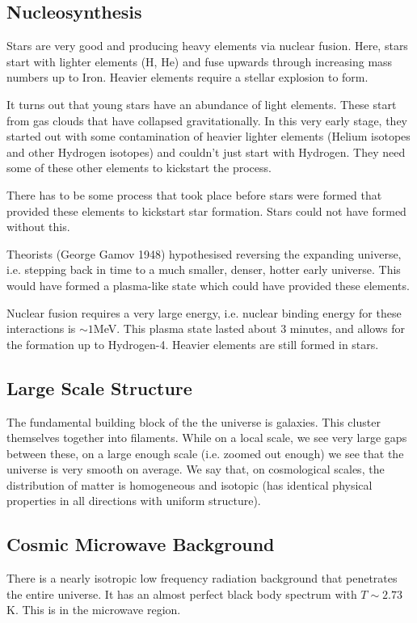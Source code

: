 \subsection{Nucleosynthesis}
Stars are very good and producing heavy elements via nuclear fusion. Here, stars start with lighter elements (H, He) and fuse upwards through increasing mass numbers up to Iron. Heavier elements require a stellar explosion to form.

It turns out that young stars have an abundance of light elements. These start from gas clouds that have collapsed gravitationally. In this very early stage, they started out with some contamination of heavier lighter elements (Helium isotopes and other Hydrogen isotopes) and couldn't just start with Hydrogen. They need some of these other elements to kickstart the process.

There has to be some process that took place before stars were formed that provided these elements to kickstart star formation. Stars could not have formed without this.

Theorists (George Gamov 1948) hypothesised reversing the expanding universe, i.e. stepping back in time to a much smaller, denser, hotter early universe. This would have formed a plasma-like state which could have provided these elements.

Nuclear fusion requires a very large energy, i.e. nuclear binding energy for these interactions is $\sim 1$MeV. This plasma state lasted about 3 minutes, and allows for the formation up to Hydrogen-4. Heavier elements are still formed in stars.

\subsection{Large Scale Structure}
The fundamental building block of the the universe is galaxies. This cluster themselves together into filaments. While on a local scale, we  see very large gaps between these, on a large enough scale (i.e. zoomed out enough) we see that the universe is very smooth on average. We say that, on cosmological scales, the distribution of matter is homogeneous and isotopic (has identical physical properties in all directions with uniform structure).

\subsection{Cosmic Microwave Background}
There is a nearly isotropic low frequency radiation background that penetrates the entire universe. It has an almost perfect black body spectrum with $T \sim 2.73$K. This is in the microwave region.

